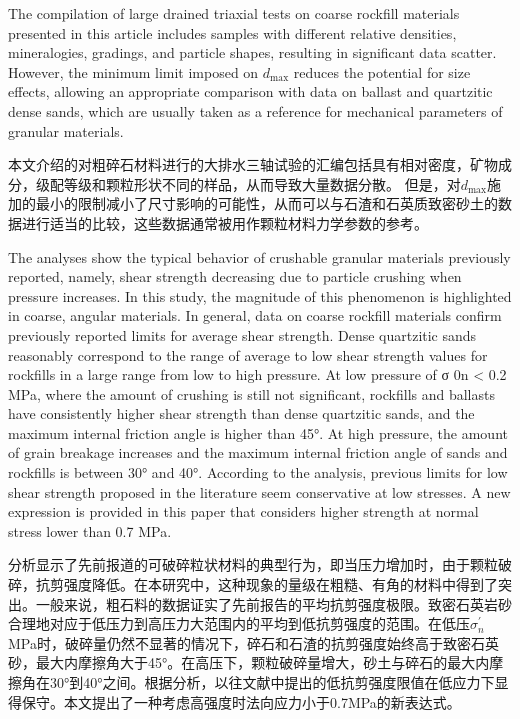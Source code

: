 \begin{ParaColumn}
    
    The compilation of large drained triaxial tests on coarse rockfill materials presented in this article includes samples with different relative densities, mineralogies, gradings, and particle shapes, resulting in significant data scatter. However, the minimum limit imposed on $d_{\max}$ reduces the potential for size effects, allowing an appropriate comparison with data on ballast and quartzitic dense sands, which are usually taken as a reference for mechanical parameters of granular materials.

    \switchcolumn

    本文介绍的对粗碎石材料进行的大排水三轴试验的汇编包括具有相对密度，矿物成分，级配等级和颗粒形状不同的样品，从而导致大量数据分散。 但是，对$d_{\max}$施加的最小的限制减小了尺寸影响的可能性，从而可以与石渣和石英质致密砂土的数据进行适当的比较，这些数据通常被用作颗粒材料力学参数的参考。
    
    \switchcolumn*

    The analyses show the typical behavior of crushable granular materials previously reported, namely, shear strength decreasing due to particle crushing when pressure increases. In this study, the magnitude of this phenomenon is highlighted in coarse, angular materials. In general, data on coarse rockfill materials confirm previously reported limits for average shear strength. Dense quartzitic sands reasonably correspond to the range of average to low shear strength values for rockfills in a large range from low to high pressure. At low pressure of σ 0n < 0.2 MPa, where the amount of crushing is still not significant, rockfills and ballasts have consistently higher shear strength than dense quartzitic sands, and the maximum internal friction angle is higher than 45°. At high pressure, the amount of grain breakage increases and the maximum internal friction angle of sands and rockfills is between 30° and 40°. According to the analysis, previous limits for low shear strength proposed in the literature seem conservative at low stresses. A new expression is provided in this paper that considers higher strength at normal stress lower than 0.7 MPa.

    \switchcolumn

    分析显示了先前报道的可破碎粒状材料的典型行为，即当压力增加时，由于颗粒破碎，抗剪强度降低。在本研究中，这种现象的量级在粗糙、有角的材料中得到了突出。一般来说，粗石料的数据证实了先前报告的平均抗剪强度极限。致密石英岩砂合理地对应于低压力到高压力大范围内的平均到低抗剪强度的范围。在低压$\sigma_n^\prime$MPa时，破碎量仍然不显著的情况下，碎石和石渣的抗剪强度始终高于致密石英砂，最大内摩擦角大于45°。在高压下，颗粒破碎量增大，砂土与碎石的最大内摩擦角在30°到40°之间。根据分析，以往文献中提出的低抗剪强度限值在低应力下显得保守。本文提出了一种考虑高强度时法向应力小于0.7MPa的新表达式。


\end{ParaColumn}
